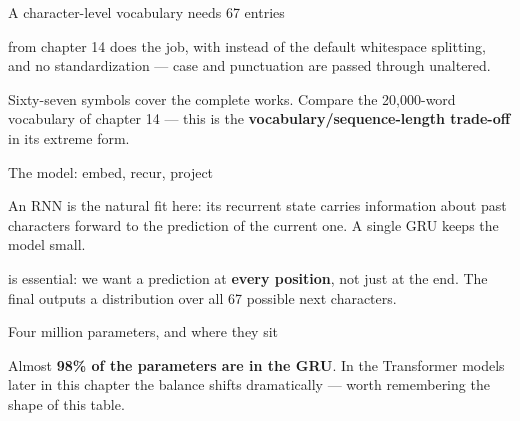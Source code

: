 \documentclass[aspectratio=169,11pt,t]{beamer}
\begin{document}
\begin{frame}[shrink=25]{A character-level vocabulary needs 67 entries}
{\fontsize{9.4}{12.6}\selectfont\color{fg2} from chapter 14 does the job, with  instead of the default whitespace splitting, and no standardization --- case and punctuation are passed through unaltered.\par}\vskip 4pt
{\fontsize{9.4}{12.6}\selectfont\color{fg2}Sixty-seven symbols cover the complete works. Compare the 20,000-word vocabulary of chapter 14 --- this is the \textbf{vocabulary/sequence-length trade-off} in its extreme form.\par}\vskip 4pt
\end{frame}

\begin{frame}[shrink=25]{The model: embed, recur, project}
{\fontsize{9.4}{12.6}\selectfont\color{fg2}An RNN is the natural fit here: its recurrent state carries information about past characters forward to the prediction of the current one. A single GRU keeps the model small.\par}\vskip 4pt
{\fontsize{9.4}{12.6}\selectfont\color{fg2} is essential: we want a prediction at \textbf{every position}, not just at the end. The final  outputs a distribution over all 67 possible next characters.\par}\vskip 4pt
\end{frame}

\begin{frame}[shrink=25]{Four million parameters, and where they sit}
{\fontsize{9.4}{12.6}\selectfont\color{fg2}Almost \textbf{98\% of the parameters are in the GRU}. In the Transformer models later in this chapter the balance shifts dramatically --- worth remembering the shape of this table.\par}\vskip 4pt
\end{frame}
\end{document}
